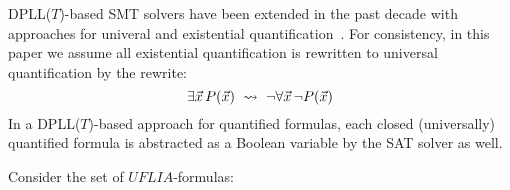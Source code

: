 \documentclass[oribibl]{llncs}
\begin{document}

DPLL($T$)-based SMT solvers have been extended in the past decade with approaches for univeral and existential quantification~\cite{}.
For consistency, in this paper we assume all existential quantification is rewritten to universal quantification by the rewrite:
\[
\exists \vec x\, P( \vec x ) \ \leadsto \  \neg \forall \vec x\, \neg P( \vec x )
\]
In a DPLL($T$)-based approach for quantified formulas, 
each closed (universally) quantified formula is abstracted as a Boolean variable by the SAT solver as well.

\begin{example}
Consider the set of $UFLIA$-formulas:

\end{example}


\begin{comment}
\begin{enumerate}
\item If $\Gamma$ is propositionally unsatisfiable
\begin{enumerate}
\item[\ ] return ``unsat".
\end{enumerate}
\item[\ ] Otherwise, let $M$ be a set of literals such that $M \models_p \Gamma$.
\item[\ ] If $M$ is $T$-unsatisfiable
\begin{enumerate}
\item[\ ] return $\funcsmtsolve( \Gamma \cup \neg C )$ for some $T$-unsatisfiable $C \subseteq M$.
\end{enumerate}
\item[\ ] Otherwise, let $( r, L ) = \funcqi( M \backslash \quants{M}, \quants{M} )$.
\item[\ ] If $r$ is ``unknown"
\begin{enumerate}
\item[\ ] return $\funcsmtsolve( \Gamma \cup L )$.
\end{enumerate}
\item Otherwise, return ``sat".
\end{enumerate}
\end{comment}
\end{document}
